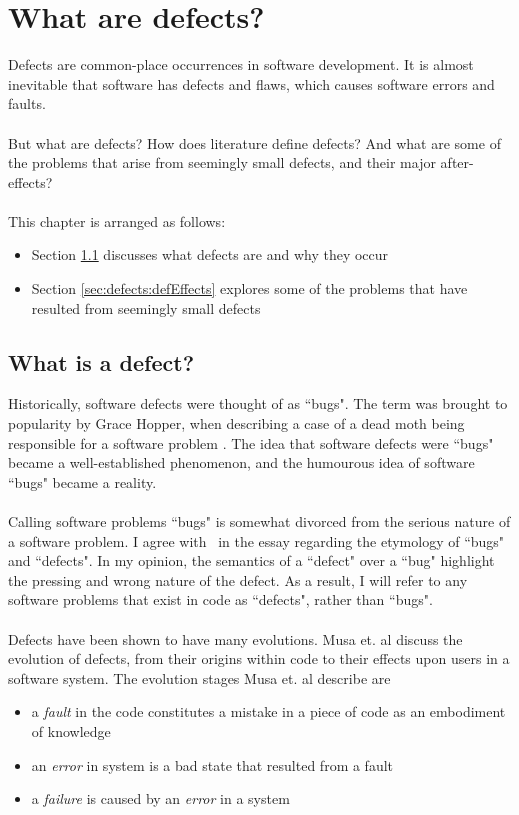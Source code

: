 \chapter{What are defects?} \label{chapter:defects}
Defects are common-place occurrences in software development.
It is almost inevitable that software has defects and flaws, which causes software errors and
faults.\\
\\
But what are defects?
How does literature define defects?
And what are some of the problems that arise from seemingly small defects,
and their major after-effects?\\
\\
This chapter is arranged as follows:
\begin{itemize}
	\item Section \ref{sec:defects:defect} discusses what defects are and why they occur
	\item Section \ref{sec:defects:defEffects} explores some of the problems
  that have resulted from seemingly small defects
\end{itemize}

\section{What is a defect?} \label{sec:defects:defect}

Historically, software defects were thought of as ``bugs".
The term was brought to popularity by Grace Hopper, when describing a case of a dead moth being
responsible for a software problem \FIXME.
The idea that software defects were ``bugs" became a well-established phenomenon, and the humourous
idea of software ``bugs" became a reality.\\
\\
Calling software problems ``bugs" is somewhat divorced from the serious nature of a software
problem.
I agree with \FIXME\ in the essay regarding the etymology of ``bugs" and ``defects".
In my opinion, the semantics of a ``defect" over a ``bug" highlight the pressing and wrong nature of the defect.
As a result, I will refer to any software problems that exist in code as ``defects", rather than
``bugs".\\
\\
Defects have been shown to have many evolutions.
Musa et. al \cite{musa1987software} discuss the evolution of defects, from their origins within
code to their effects upon users in a software system.
The evolution stages Musa et. al describe are
\begin{itemize}
	\item a {\em fault} in the code constitutes a mistake in a piece of code as an embodiment of
		knowledge
	\item an {\em error} in system is a bad state that resulted from a fault
	\item a {\em failure} is caused by an {\em error} in a system
\end{itemize}

